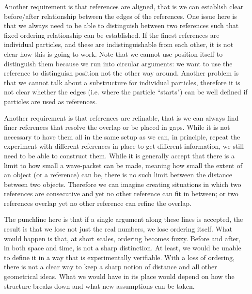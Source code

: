 \documentclass{article}
\begin{document}
Another requirement is that references are aligned, that is we can establish clear before/after relationship between the edges of the references. One issue here is that we always need to be able to distinguish between two references such that fixed ordering relationship can be established. If the finest references are individual particles, and these are indistinguishable from each other, it is not clear how this is going to work. Note that we cannot use position itself to distinguish them because we run into circular arguments: we want to use the reference to distinguish position not the other way around. Another problem is that we cannot talk about a substructure for individual particles, therefore it is not clear whether the edges (i.e. where the particle ``starts") can be well defined if particles are used as references.

Another requirement is that references are refinable, that is we can always find finer references that resolve the overlap or be placed in gaps. While it is not necessary to have them all in the same setup as we can, in principle, repeat the experiment with different references in place to get different information, we still need to be able to construct them. While it is generally accept that there is a limit to how small a wave-packet can be made, meaning how small the extent of an object (or a reference) can be, there is no such limit between the distance between two objects. Therefore we can imagine creating situations in which two references are consecutive and yet no other reference can fit in between; or two references overlap yet no other reference can refine the overlap.

The punchline here is that if a single argument along these lines is accepted, the result is that we lose not just the real numbers, we lose ordering itself. What would happen is that, at short scales, ordering becomes fuzzy. Before and after, in both space and time, is not a sharp distinction. At least, we would be unable to define it in a way that is experimentally verifiable. With a loss of ordering, there is not a clear way to keep a sharp notion of distance and all other geometrical ideas. What we would have in its place would depend on how the structure breaks down and what new assumptions can be taken.





\end{document}

